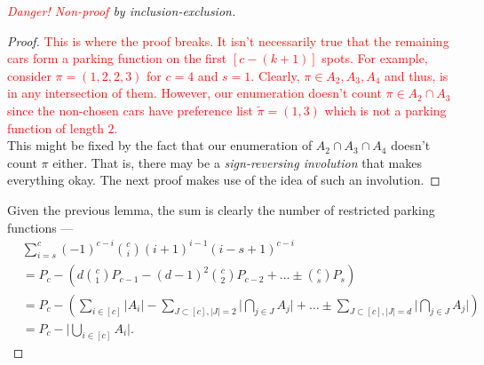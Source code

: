 \begin{proof}[\textcolor{red}{Danger! Non-proof} by inclusion-exclusion]
\begin{proof}
		\textcolor{red}{This is where the proof breaks. It isn't necessarily true that the remaining cars form a parking function on the first $[c - (k + 1)]$ spots. For example, consider $\pi = (1, 2, 2, 3)$ for $c = 4$ and $s = 1$. Clearly, $\pi \in A_{2}, A_{3}, A_{4}$ and thus, is in any intersection of them. However, our enumeration doesn't count $\pi \in A_{2} \cap A_{3}$ since the non-chosen cars have preference list $\tilde{\pi} = (1, 3)$ which is not a parking function of length $2$.} \\

		This might be fixed by the fact that our enumeration of $A_{2} \cap A_{3} \cap A_{4}$ doesn't count $\pi$ either. That is, there may be a \textit{sign-reversing involution} that makes everything okay. The next proof makes use of the idea of such an involution.
	\end{proof}
	Given the previous lemma, the sum is clearly the number of restricted parking functions ---
	\[
		\begin{split}
			& \sum_{i = s}^{c} (-1)^{c - i} \binom{c}{i}(i + 1)^{i - 1}(i - s + 1)^{c - i} \\
			& = P_{c} - \left ( d \binom{c}{1} P_{c - 1} - (d - 1)^{2} \binom{c}{2} P_{c - 2} + \dots \pm \binom{c}{s} P_{s} \right ) \\
												     & = P_{c} - (\sum_{i \in [c]} \lvert A_{i} \rvert - \sum_{J \subset [c], \lvert J \rvert = 2} \lvert \bigcap_{j \in J} A_{j} \rvert + \dots \pm \sum_{J \subset [c], \lvert J \rvert = d} \lvert \bigcap_{j \in J} A_{j} \rvert) \\
												     & = P_{c} - \lvert \bigcup_{i \in [c]} A_{i} \rvert.
		\end{split}
	\]
\end{proof}

